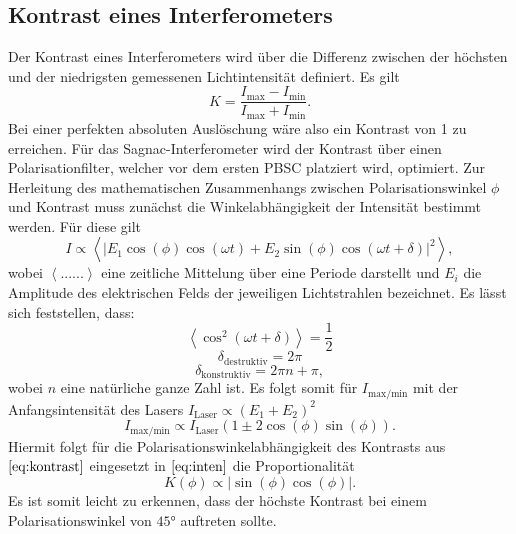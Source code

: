 \subsection{Kontrast eines Interferometers}
Der Kontrast eines Interferometers wird über die  Differenz zwischen der höchsten und der niedrigsten gemessenen Lichtintensität definiert. Es gilt
\begin{equation}
  K=\frac{I_{\text{max}}-I_{\text{min}}}{I_{\text{max}}+I_{\text{min}}}.
  \label{eq:kontrast}
\end{equation}
Bei einer perfekten absoluten Auslöschung wäre also ein Kontrast von 1 zu erreichen. Für das Sagnac-Interferometer wird der Kontrast über einen Polarisationfilter, welcher vor dem ersten PBSC platziert
wird, optimiert. Zur Herleitung des mathematischen Zusammenhangs zwischen Polarisationswinkel $\phi$ und Kontrast muss zunächst die Winkelabhängigkeit der Intensität bestimmt werden.
Für diese gilt
\begin{equation}
I \propto \left<\left|E_1\cos{(\phi)}\cos{(\omega t)}+E_2\sin{(\phi)}\cos{(\omega t+\delta)}\right|^2\right> ,
\end{equation}
wobei $\left<......\right>$ eine zeitliche Mittelung über eine Periode darstellt und $E_i$ die Amplitude des elektrischen Felds der jeweiligen Lichtstrahlen bezeichnet.
Es lässt sich feststellen, dass:
\begin{equation}
  \left<\cos^2(\omega t +\delta)\right> = \frac{1}{2} \nonumber
\end{equation}
\begin{equation}
  \delta_{\text{destruktiv}}=2\pi  \nonumber
\end{equation}
\begin{equation}
  \delta_{\text{konstruktiv}}=2\pi n + \pi \nonumber ,
\end{equation}
wobei $n$ eine natürliche ganze Zahl ist. Es folgt somit für $I_{\text{max}/\text{min}}$ mit der Anfangsintensität des Lasers $I_\text{Laser}\propto (E_1+E_2)^2$
\begin{equation}
  I_{\text{max}/\text{min}} \propto I_{\text{Laser}}\left(1 \pm 2\cos(\phi)\sin(\phi)\right).
  \label{eq:inten}
\end{equation}
Hiermit folgt für die Polarisationswinkelabhängigkeit des Kontrasts aus $\ref{eq:kontrast}$ eingesetzt in $\ref{eq:inten}$ die Proportionalität
\begin{equation}
  K(\phi)\propto |\sin(\phi)\cos(\phi)|.
\end{equation}
Es ist somit leicht zu erkennen, dass der höchste Kontrast bei einem Polarisationswinkel von $45°$ auftreten sollte.
